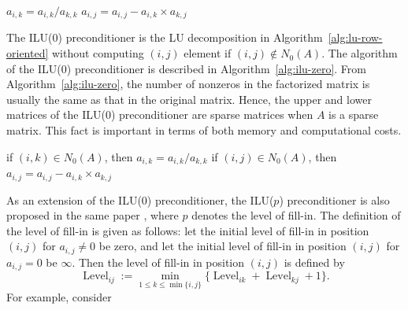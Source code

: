 \begin{algorithm}[H]\caption{{The LU decomposition (a slightly modified version of Algorithm\ \ref{alg:lu-decomposition})}}\label{alg:lu-row-oriented}\begin{algorithmic}[1]
\State $a_{i,k}=a_{i,k}/a_{k,k}$
\State $a_{i,j}=a_{i,j}-a_{i,k}\times a_{k,j}$
\EndFor\EndFor\EndFor\end{algorithmic}\end{algorithm}
{The ILU(0) preconditioner is the LU decomposition in Algorithm\ \ref{alg:lu-row-oriented} without computing $(i,j)$ element if $(i,j)\notin N_0(A)$. The algorithm of the ILU(0) preconditioner is described in Algorithm\ \ref{alg:ilu-zero}. From Algorithm\ \ref{alg:ilu-zero}, the number of nonzeros in the factorized matrix is usually the same as that in the original matrix. Hence, the upper and lower matrices of the ILU(0) preconditioner are sparse matrices when $A$ is a sparse matrix. This fact is important in terms of both memory and computational costs.}
\begin{algorithm}[H]\caption{{The ILU(0) preconditioner}}\label{alg:ilu-zero}\begin{algorithmic}[1]
\State if $(i,k)\in N_0(A)$, then $a_{i,k}=a_{i,k}/a_{k,k}$
\State if $(i,j)\in N_0(A)$, then $a_{i,j}=a_{i,j}-a_{i,k}\times a_{k,j}$
\EndFor\EndFor\EndFor\end{algorithmic}\end{algorithm}
{As an extension of the ILU(0) preconditioner, the ILU($p$) preconditioner is also proposed in the same paper , where $p$ denotes the level of fill-in. The definition of the level of fill-in is given as follows: let the initial level of fill-in in position $(i,j)$ for $a_{i,j}\ne0$ be zero, and let the initial level of fill-in in position $(i,j)$ for $a_{i,j}=0$ be $\infty$. Then the level of fill-in in position $(i,j)$ is defined by}
\begin{equation}\label{eq:ilu-fill-level}\operatorname{Level}_{ij}:=\min_{1\le k\le\min\{i,j\}}\{\operatorname{Level}_{ik}+\operatorname{Level}_{kj}+1\}.\end{equation}
{For example, consider}

